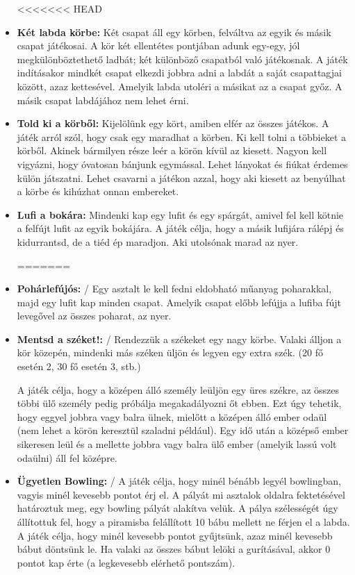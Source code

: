 \documentclass[a4paper, 12pt, twoside, openright]{article}
\begin{document}
\begin{itemize}
<<<<<<< HEAD

\item \textbf{Két labda körbe:} Két csapat áll egy körben, felváltva az egyik és másik csapat játékosai. A kör két ellentétes pontjában adunk egy-egy, jól megkülönböztethető ladbát; két különböző csapatból való játékosnak. A játék indításakor mindkét csapat elkezdi jobbra adni a labdát a saját csapattagjai között, azaz kettesével. Amelyik labda utoléri a másikat az a csapat győz. A másik csapat labdájához nem lehet érni.


\item \textbf{Told ki a körből:} Kijelölünk egy kört, amiben elfér az összes játékos. A játék arról szól, hogy csak egy maradhat a körben. Ki kell tolni a többieket a körből. Akinek bármilyen része leér a körön kívül az kiesett. Nagyon kell vigyázni, hogy óvatosan bánjunk egymással. Lehet lányokat és fiúkat érdemes külön játszatni. Lehet csavarni a játékon azzal, hogy aki kiesett az benyúlhat a körbe és kihúzhat onnan embereket.

\item \textbf{Lufi a bokára:} Mindenki kap egy lufit és egy spárgát, amivel fel kell kötnie a felfújt lufit az egyik bokájára. A játék célja, hogy a másik lufijára rálépj és kidurrantsd, de a tiéd ép maradjon. Aki utolsónak marad az nyer.

=======
\item \textbf{Pohárlefújós:} / Egy asztalt le kell fedni eldobható műanyag poharakkal, majd egy lufit kap minden csapat. Amelyik csapat előbb lefújja a lufiba fújt levegővel az összes poharat, az nyer.
\item \textbf{Mentsd a széket!:} / Rendezzük a székeket egy nagy körbe. Valaki álljon a kör közepén, mindenki más széken üljön és legyen egy extra szék. (20 fő esetén 2, 30 fő esetén 3, stb.)

A játék célja, hogy a középen álló személy leüljön egy üres székre, az összes többi ülő személy pedig próbálja megakadályozni őt ebben. Ezt úgy tehetik, hogy eggyel jobbra vagy balra ülnek, mielőtt a középen álló ember odaül (nem lehet a körön keresztül szaladni például). Egy idő után a középső ember sikeresen leül és a mellette jobbra vagy balra ülő ember (amelyik lassú volt odaülni) áll fel középre.
\item \textbf{Ügyetlen Bowling:} / A játék célja, hogy minél bénább legyél bowlingban, vagyis minél kevesebb pontot érj el. A pályát mi asztalok oldalra fektetésével határoztuk meg, egy bowling pályát alakítva velük. A pálya szélességét úgy állítottuk fel, hogy a piramisba felállított 10 bábu mellett ne férjen el a labda. A játék célja, hogy minél kevesebb pontot gyűjtsünk, azaz minél kevesebb bábut döntsünk le. Ha valaki az összes bábut lelöki a gurításával, akkor 0 pontot kap érte (a legkevesebb elérhető pontszám).


\end{itemize}
\end{document}
